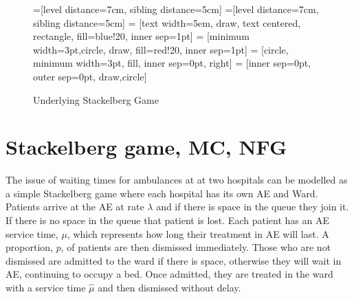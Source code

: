 \documentclass[a0,landscape]{a0poster}
\begin{document}
\vspace{1cm}
\begin{multicols}{2}


\begin{figure}[H]
    \begin{center}
        =[level distance=7cm, sibling distance=5cm]
        =[level distance=7cm, sibling distance=5cm]
         = [text width=5em, draw, text centered, rectangle, fill=blue!20, inner sep=1pt]
         = [minimum width=3pt,circle,  draw, fill=red!20, inner sep=1pt]
         = [circle, minimum width=3pt, fill, inner sep=0pt, right]
         = [inner sep=0pt, outer sep=0pt, draw,circle]
        \caption{Underlying Stackelberg Game}\label{fig:stackelberg_game}
    \end{center}
\end{figure}


\color{Goldenrod}
\section*{Stackelberg game, MC, NFG}
The issue of waiting times for ambulances at at two hospitals can be modelled as a simple Stackelberg game where each hospital has its own AE and Ward.
Patients arrive at the AE at rate $\lambda$ and if there is space in the queue they join it.
If there is no space in the queue that patient is lost.
Each patient has an AE service time, $\mu$, which represents how long their treatment in AE will last.
A proportion, $p$, of patients are then dismissed immediately.
Those who are not dismissed are admitted to the ward if there is space, otherwise they will wait in AE, continuing to occupy a bed.
Once admitted, they are treated in the ward with a service time $\hat{\mu}$ and then dismissed without delay.



\end{multicols}
\end{document}
